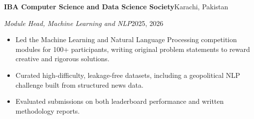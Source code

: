 \documentclass[11pt,letterpaper]{article}
\newenvironment{entrybox}
  {\par\vspace{0.5em}\noindent\begin{minipage}{\linewidth}}
  {\end{minipage}\par}
\newcommand{\orgline}[2]{\textbf{#1}\hfill #2\par}
\newcommand{\roleline}[2]{\textit{#1}\hfill #2\par\vspace{0.15em}}
\begin{document}
\begin{entrybox}
  \orgline{IBA Computer Science and Data Science Society}{Karachi, Pakistan}
  \roleline{Module Head, Machine Learning and NLP}{2025, 2026}
  \begin{itemize}
    \item Led the Machine Learning and Natural Language Processing competition modules for 100+
          participants, writing original problem statements to reward creative and rigorous
          solutions.
    \item Curated high-difficulty, leakage-free datasets, including a geopolitical NLP challenge
          built from structured news data.
    \item Evaluated submissions on both leaderboard performance and written methodology reports.
  \end{itemize}
\end{entrybox}
\end{document}
